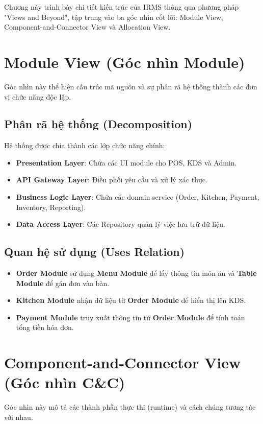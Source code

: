 Chương này trình bày chi tiết kiến trúc của IRMS thông qua phương pháp "Views and Beyond", tập trung vào ba góc nhìn cốt lõi: Module View, Component-and-Connector View và Allocation View.

\section{Module View (Góc nhìn Module)}

Góc nhìn này thể hiện cấu trúc mã nguồn và sự phân rã hệ thống thành các đơn vị chức năng độc lập.

\subsection{Phân rã hệ thống (Decomposition)}
Hệ thống được chia thành các lớp chức năng chính:
\begin{itemize}
    \item \textbf{Presentation Layer}: Chứa các UI module cho POS, KDS và Admin.
    \item \textbf{API Gateway Layer}: Điều phối yêu cầu và xử lý xác thực.
    \item \textbf{Business Logic Layer}: Chứa các domain service (Order, Kitchen, Payment, Inventory, Reporting).
    \item \textbf{Data Access Layer}: Các Repository quản lý việc lưu trữ dữ liệu.
\end{itemize}

\subsection{Quan hệ sử dụng (Uses Relation)}
\begin{itemize}
    \item \textbf{Order Module} sử dụng \textbf{Menu Module} để lấy thông tin món ăn và \textbf{Table Module} để gán đơn vào bàn.
    \item \textbf{Kitchen Module} nhận dữ liệu từ \textbf{Order Module} để hiển thị lên KDS.
    \item \textbf{Payment Module} truy xuất thông tin từ \textbf{Order Module} để tính toán tổng tiền hóa đơn.
\end{itemize}

\section{Component-and-Connector View (Góc nhìn C\&C)}

Góc nhìn này mô tả các thành phần thực thi (runtime) và cách chúng tương tác với nhau.


